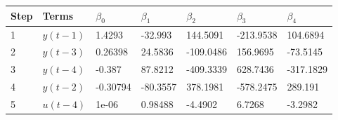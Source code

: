 \begin{tabular}{lllllll}
Step & Terms & $\beta_{0}$ & $\beta_{1}$ & $\beta_{2}$ & $\beta_{3}$ & $\beta_{4}$ \\ 
\hline 
1 & $y(t-1)$ & 1.4293 & -32.993 & 144.5091 & -213.9538 & 104.6894 \\ 
2 & $y(t-3)$ & 0.26398 & 24.5836 & -109.0486 & 156.9695 & -73.5145 \\ 
3 & $y(t-4)$ & -0.387 & 87.8212 & -409.3339 & 628.7436 & -317.1829 \\ 
4 & $y(t-2)$ & -0.30794 & -80.3557 & 378.1981 & -578.2475 & 289.191 \\ 
5 & $u(t-4)$ & 1e-06 & 0.98488 & -4.4902 & 6.7268 & -3.2982 \\ 
\hline 
\end{tabular}